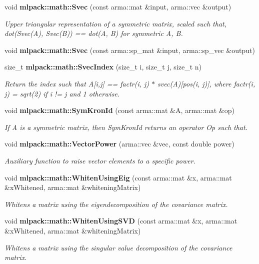 \begin{DoxyCompactItemize}
void {\bf mlpack\+::math\+::\+Svec} (const arma\+::mat \&input, arma\+::vec \&output)
\begin{DoxyCompactList}\small\item\em Upper triangular representation of a symmetric matrix, scaled such that, dot(Svec(\+A), Svec(\+B)) == dot(\+A, B) for symmetric A, B. \end{DoxyCompactList}\item 
void {\bf mlpack\+::math\+::\+Svec} (const arma\+::sp\+\_\+mat \&input, arma\+::sp\+\_\+vec \&output)
\item 
size\+\_\+t {\bf mlpack\+::math\+::\+Svec\+Index} (size\+\_\+t i, size\+\_\+t j, size\+\_\+t n)
\begin{DoxyCompactList}\small\item\em Return the index such that A[i,j] == factr(i, j) $\ast$ svec(\+A)[pos(i, j)], where factr(i, j) = sqrt(2) if i != j and 1 otherwise. \end{DoxyCompactList}\item 
void {\bf mlpack\+::math\+::\+Sym\+Kron\+Id} (const arma\+::mat \&A, arma\+::mat \&op)
\begin{DoxyCompactList}\small\item\em If A is a symmetric matrix, then Sym\+Kron\+Id returns an operator Op such that. \end{DoxyCompactList}\item 
void {\bf mlpack\+::math\+::\+Vector\+Power} (arma\+::vec \&vec, const double power)
\begin{DoxyCompactList}\small\item\em Auxiliary function to raise vector elements to a specific power. \end{DoxyCompactList}\item 
void {\bf mlpack\+::math\+::\+Whiten\+Using\+Eig} (const arma\+::mat \&x, arma\+::mat \&x\+Whitened, arma\+::mat \&whitening\+Matrix)
\begin{DoxyCompactList}\small\item\em Whitens a matrix using the eigendecomposition of the covariance matrix. \end{DoxyCompactList}\item 
void {\bf mlpack\+::math\+::\+Whiten\+Using\+S\+VD} (const arma\+::mat \&x, arma\+::mat \&x\+Whitened, arma\+::mat \&whitening\+Matrix)
\begin{DoxyCompactList}\small\item\em Whitens a matrix using the singular value decomposition of the covariance matrix. \end{DoxyCompactList}\end{DoxyCompactItemize}



